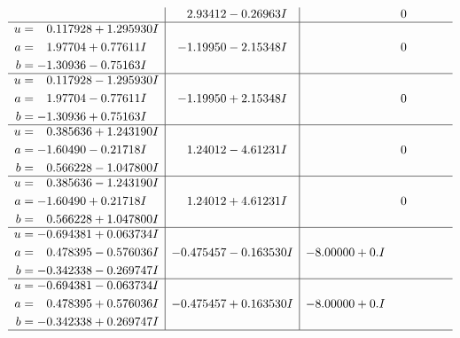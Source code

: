 \documentclass[1p]{elsarticle_modified}
\theoremstyle{definition}
\begin{document}
$$\begin{array}{c|c|c}
 & \phantom{-}2.93412 - 0.26963 I & \phantom{-0.000000 } 0 \\ \hline\begin{aligned}
u &= \phantom{-}0.117928 + 1.295930 I \\
a &= \phantom{-}1.97704 + 0.77611 I \\
b &= -1.30936 - 0.75163 I\end{aligned}
 & -1.19950 - 2.15348 I & \phantom{-0.000000 } 0 \\ \hline\begin{aligned}
u &= \phantom{-}0.117928 - 1.295930 I \\
a &= \phantom{-}1.97704 - 0.77611 I \\
b &= -1.30936 + 0.75163 I\end{aligned}
 & -1.19950 + 2.15348 I & \phantom{-0.000000 } 0 \\ \hline\begin{aligned}
u &= \phantom{-}0.385636 + 1.243190 I \\
a &= -1.60490 - 0.21718 I \\
b &= \phantom{-}0.566228 - 1.047800 I\end{aligned}
 & \phantom{-}1.24012 - 4.61231 I & \phantom{-0.000000 } 0 \\ \hline\begin{aligned}
u &= \phantom{-}0.385636 - 1.243190 I \\
a &= -1.60490 + 0.21718 I \\
b &= \phantom{-}0.566228 + 1.047800 I\end{aligned}
 & \phantom{-}1.24012 + 4.61231 I & \phantom{-0.000000 } 0 \\ \hline\begin{aligned}
u &= -0.694381 + 0.063734 I \\
a &= \phantom{-}0.478395 - 0.576036 I \\
b &= -0.342338 - 0.269747 I\end{aligned}
 & -0.475457 - 0.163530 I & -8.00000 + 0. I\phantom{ +0.000000I} \\ \hline\begin{aligned}
u &= -0.694381 - 0.063734 I \\
a &= \phantom{-}0.478395 + 0.576036 I \\
b &= -0.342338 + 0.269747 I\end{aligned}
 & -0.475457 + 0.163530 I & -8.00000 + 0. I\phantom{ +0.000000I}\\
 \hline 
 \end{array}$$\newpage$$\begin{array}{c|c|c}  

\end{array}$$
\end{document}
